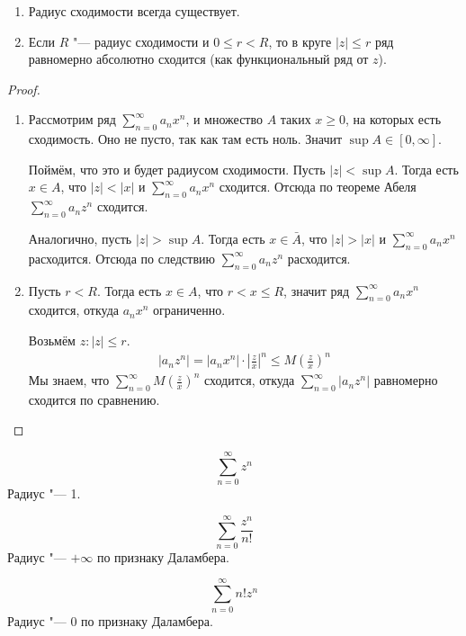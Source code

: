 \begin{theorem}
	\begin{enumerate}
	\item
		Радиус сходимости всегда существует.

	\item
		Если $R$ "--- радиус сходимости и $0 \le r < R$,
		то в круге $|z| \le r$ ряд равномерно абсолютно сходится (как функциональный ряд от $z$).
	\end{enumerate}
\end{theorem}
\begin{proof}
	\begin{enumerate}
	\item
		Рассмотрим ряд $\sum_{n=0}^\infty a_n x^n$, и множество $A$ таких $x \ge 0$, на которых есть сходимость.
		Оно не пусто, так как там есть ноль.
		Значит $\sup A \in [0, \infty]$.

		Поймём, что это и будет радиусом сходимости.
		Пусть $|z| < \sup A$.
		Тогда есть $x \in A$, что $|z| < |x|$ и $\sum_{n=0}^\infty a_n x^n$ сходится.
		Отсюда по теореме Абеля $\sum_{n=0}^\infty a_n z^n$ сходится.

		Аналогично, пусть $|z| > \sup A$.
		Тогда есть $x \in \bar A$, что $|z| > |x|$ и $\sum_{n=0}^\infty a_n x^n$ расходится.
		Отсюда по следствию $\sum_{n=0}^\infty a_n z^n$ расходится.

	\item
		Пусть $r < R$.
		Тогда есть $x \in A$, что $r < x \le R$, значит ряд $\sum_{n=0}^\infty a_n x^n$ сходится,
		откуда $a_n x^n$ ограниченно.

		Возьмём $z\colon |z| \le r$.
		\begin{gather*}
			|a_nz^n| = |a_nx^n| \cdot \left| \frac zx \right|^n \le M \left( \frac zx \right)^n
		\end{gather*}
		Мы знаем, что $\sum_{n=0}^\infty M \left( \frac zx \right)^n$ сходится,
		откуда $\sum_{n=0}^\infty |a_n z^n|$ равномерно сходится по сравнению.
	\end{enumerate}
\end{proof}

\begin{exmp}
	\[ \sum_{n=0}^\infty z^n \]
	Радиус "--- 1.
\end{exmp}

\begin{exmp}
	\[ \sum_{n=0}^\infty \frac{z^n}{n!} \]
	Радиус "--- $+\infty$ по признаку Даламбера.
\end{exmp}

\begin{exmp}
	\[ \sum_{n=0}^\infty n! z^n \]
	Радиус "--- $0$ по признаку Даламбера.
\end{exmp}

